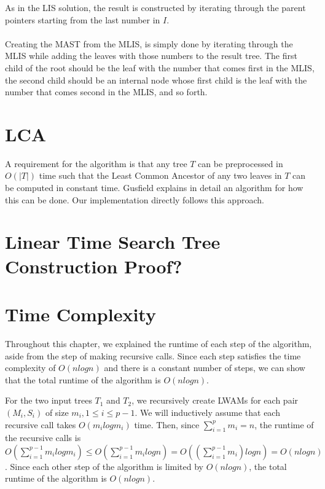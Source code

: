 
As in the LIS solution, the result is constructed by iterating through the parent pointers starting from the last number in $I$.\\
\\
Creating the MAST from the MLIS, is simply done by iterating through the MLIS while adding the leaves with those numbers to the result tree. The first child of the root should be the leaf with the number that comes first in the MLIS, the second child should be an internal node whose first child is the leaf with the number that comes second in the MLIS, and so forth.

\section{LCA}
\label{lcaSection}
A requirement for the algorithm is that any tree $T$ can be preprocessed in $O(|T|)$ time such that the Least Common Ancestor of any two leaves in $T$ can be computed in constant time. Gusfield  explains in detail an algorithm for how this can be done. Our implementation directly follows this approach.

\section{Linear Time Search Tree Construction Proof?}

\section{Time Complexity}
Throughout this chapter, we explained the runtime of each step of the algorithm, aside from the step of making recursive calls. Since each step satisfies the time complexity of $O(nlogn)$ and there is a constant number of steps, we can show that the total runtime of the algorithm is $O(nlogn)$.

For the two input trees $T_1$ and $T_2$, we recursively create LWAMs for each pair $(M_i, S_i)$ of size $m_i, 1 \le i \le p-1$. We will inductively assume that each recursive call takes $O(m_ilogm_i)$ time. Then, since $\sum_{i=1}^p m_i = n$, the runtime of the recursive calls is $O(\sum_{i=1}^{p-1} m_ilogm_i) \le O(\sum_{i=1}^{p-1} m_ilogn) = O((\sum_{i=1}^{p-1} m_i)logn) = O(nlogn)$. Since each other step of the algorithm is limited by $O(nlogn)$, the total runtime of the algorithm is $O(nlogn)$.

